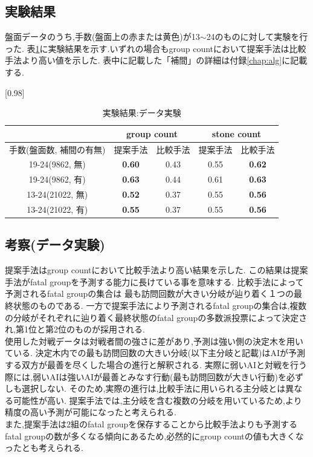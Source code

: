 \subsection{実験結果}
盤面データのうち,手数(盤面上の赤または黄色)が13$\sim$24のものに対して実験を行った.
表\ref{table:result-online}に実験結果を示す.いずれの場合もgroup countにおいて提案手法は比較手法より高い値を示した.
表中に記載した「補間」の詳細は付録\ref{chap:alg}に記載する.
\begin{table}[H]
	\caption{実験結果:データ実験}
	\centering
	\scalebox{0.98}[0.98]{
		\begin{tabular}{c|c|c|c|c}
			\multicolumn{1}{c}{} & \multicolumn{2}{|c|}{group count} 
			& \multicolumn{2}{c|}{stone count}\\ \hline \hline
			手数(盤面数, 補間の有無)    & 提案手法 & 比較手法 & 提案手法 & 比較手法 \\ \hline
			19-24(9862, 無)    & \bf{0.60} & 0.43 & 0.55 & \bf{0.62} \\
			19-24(9862, 有)    & \bf{0.63} & 0.44 & 0.61 & \bf{0.63}  \\
			13-24(21022, 無)   & \bf{0.52} & 0.37 & 0.55 & \bf{0.56}  \\
			13-24(21022, 有)   & \bf{0.55} & 0.37 & 0.55 & \bf{0.56}  \\
		\end{tabular}
	}
	\label{table:result-online}
\end{table}
\subsection{考察(データ実験)}
提案手法はgroup countにおいて比較手法より高い結果を示した.
この結果は提案手法がfatal groupを予測する能力に長けている事を意味する.
比較手法によって予測されるfatal groupの集合は
最も訪問回数が大きい分岐が辿り着く１つの最終状態のものである.
一方で提案手法により予測されるfatal groupの集合は,複数の分岐がそれぞれに辿り着く最終状態のfatal groupの多数派投票によって決定され,第1位と第2位のものが採用される.\\
使用した対戦データは対戦者間の強さに差があり,予測は強い側の決定木を用いている.
決定木内での最も訪問回数の大きい分岐(以下主分岐と記載)はAIが予測する双方が最善を尽くした場合の進行と解釈される.
実際に弱いAIと対戦を行う際には,弱いAIは強いAIが最善とみなす行動(最も訪問回数が大きい行動)を必ずしも選択しない.
そのため,実際の進行は,比較手法に用いられる主分岐とは異なる可能性が高い.
提案手法では,主分岐を含む複数の分岐を用いているため,より精度の高い予測が可能になったと考えられる.\\
また,提案手法は2組のfatal groupを保存することから比較手法よりも予測するfatal groupの数が多くなる傾向にあるため,必然的にgroup countの値も大きくなったとも考えられる.



